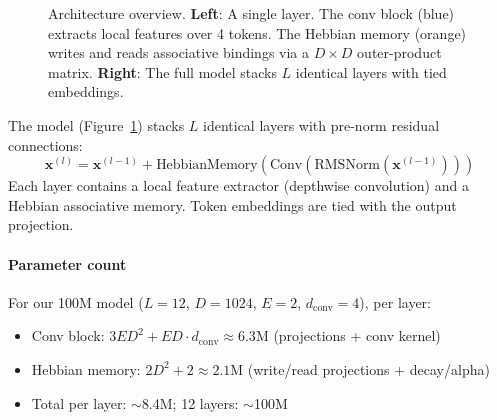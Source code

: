 \documentclass{article}
\newcommand{\vx}{\mathbf{x}}
\begin{document}
\begin{figure}[t]
\caption{Architecture overview. \textbf{Left}: A single layer. The conv block (blue) extracts local features over 4 tokens. The Hebbian memory (orange) writes and reads associative bindings via a $D{\times}D$ outer-product matrix. \textbf{Right}: The full model stacks $L$ identical layers with tied embeddings.}
\label{fig:arch}
\end{figure}

The model (Figure~\ref{fig:arch}) stacks $L$ identical layers with pre-norm residual connections:
\begin{equation}
    \vx^{(l)} = \vx^{(l-1)} + \text{HebbianMemory}(\text{Conv}(\text{RMSNorm}(\vx^{(l-1)})))
\end{equation}
Each layer contains a local feature extractor (depthwise convolution) and a Hebbian associative memory. Token embeddings are tied with the output projection.

\paragraph{Parameter count} For our 100M model ($L{=}12$, $D{=}1024$, $E{=}2$, $d_\text{conv}{=}4$), per layer:
\begin{itemize}
    \item Conv block: $3ED^2 + ED \cdot d_\text{conv} \approx 6.3\text{M}$ (projections + conv kernel)
    \item Hebbian memory: $2D^2 + 2 \approx 2.1\text{M}$ (write/read projections + decay/alpha)
    \item Total per layer: $\sim$8.4M; 12 layers: $\sim$100M
\end{itemize}
\end{document}
